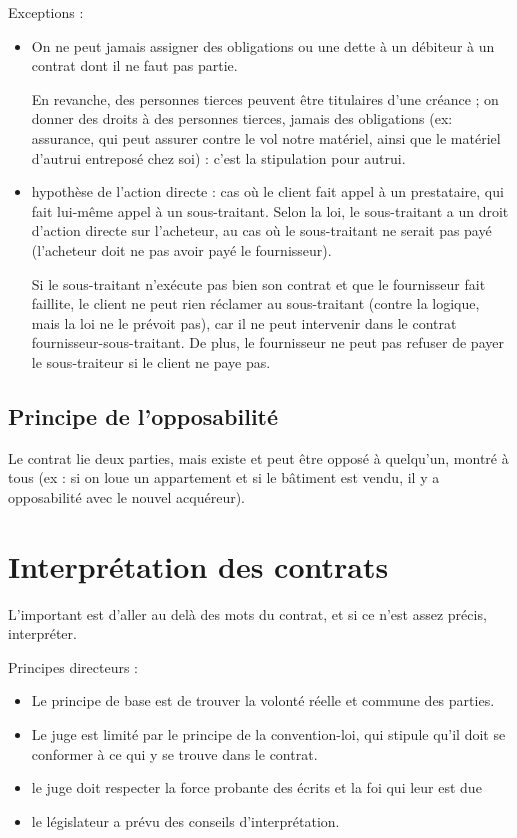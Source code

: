 		\pagebreak
		Exceptions :
		\begin{itemize}
			\item On ne peut jamais assigner des obligations ou une dette à un débiteur à un contrat dont il ne faut pas partie. 
			
			En revanche, des personnes tierces peuvent être titulaires d'une créance ; on donner des droits à des personnes tierces, jamais des obligations (ex: assurance, qui peut assurer contre le vol notre matériel, ainsi que le matériel d'autrui entreposé chez soi) : c'est la stipulation pour autrui.
			
			\item hypothèse de l'action directe : cas où le client fait appel à un prestataire, qui fait lui-même appel à un sous-traitant. Selon la loi, le sous-traitant a un droit d'action directe sur l'acheteur, au cas où le sous-traitant ne serait pas payé (l'acheteur doit ne pas avoir payé le fournisseur).
			
			Si le sous-traitant n'exécute pas bien son contrat et que le fournisseur fait faillite, le client ne peut rien réclamer au sous-traitant (contre la logique, mais la loi ne le prévoit pas), car il ne peut intervenir dans le contrat fournisseur-sous-traitant. De plus, le fournisseur ne peut pas refuser de payer le sous-traiteur si le client ne paye pas.
		\end{itemize}
		
		
		\subsection{Principe de l'opposabilité}
		
		
		Le contrat lie deux parties, mais existe et peut être opposé à quelqu'un, montré à tous (ex : si on loue un appartement et si le bâtiment est vendu, il y a opposabilité avec le nouvel acquéreur).
		
	
	\section{Interprétation des contrats}
	
	L'important est d'aller au delà des mots du contrat, et si ce n'est assez précis, interpréter.
	
	Principes directeurs :
	\begin{itemize}
		\item Le principe de base est de trouver la volonté réelle et commune des parties.
		\item Le juge est limité par le principe de la convention-loi, qui stipule qu'il doit se conformer à ce qui y se trouve dans le contrat.
		\item le juge doit respecter la force probante des écrits et la foi qui leur est due
		\item le législateur a prévu des conseils d'interprétation.
	\end{itemize}
